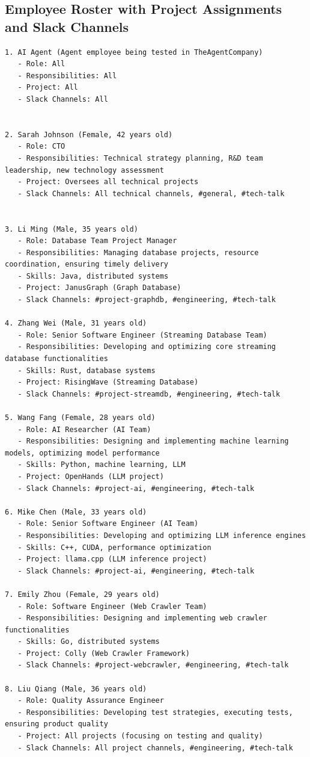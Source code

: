 \subsection{\tac Employee Roster with Project Assignments and Slack Channels}
\begin{lstlisting}
1. AI Agent (Agent employee being tested in TheAgentCompany)
   - Role: All
   - Responsibilities: All
   - Project: All
   - Slack Channels: All


2. Sarah Johnson (Female, 42 years old)
   - Role: CTO
   - Responsibilities: Technical strategy planning, R&D team leadership, new technology assessment
   - Project: Oversees all technical projects
   - Slack Channels: All technical channels, #general, #tech-talk


3. Li Ming (Male, 35 years old)
   - Role: Database Team Project Manager
   - Responsibilities: Managing database projects, resource coordination, ensuring timely delivery
   - Skills: Java, distributed systems
   - Project: JanusGraph (Graph Database)
   - Slack Channels: #project-graphdb, #engineering, #tech-talk

4. Zhang Wei (Male, 31 years old)
   - Role: Senior Software Engineer (Streaming Database Team)
   - Responsibilities: Developing and optimizing core streaming database functionalities
   - Skills: Rust, database systems
   - Project: RisingWave (Streaming Database)
   - Slack Channels: #project-streamdb, #engineering, #tech-talk

5. Wang Fang (Female, 28 years old)
   - Role: AI Researcher (AI Team)
   - Responsibilities: Designing and implementing machine learning models, optimizing model performance
   - Skills: Python, machine learning, LLM
   - Project: OpenHands (LLM project)
   - Slack Channels: #project-ai, #engineering, #tech-talk

6. Mike Chen (Male, 33 years old)
   - Role: Senior Software Engineer (AI Team)
   - Responsibilities: Developing and optimizing LLM inference engines
   - Skills: C++, CUDA, performance optimization
   - Project: llama.cpp (LLM inference project)
   - Slack Channels: #project-ai, #engineering, #tech-talk

7. Emily Zhou (Female, 29 years old)
   - Role: Software Engineer (Web Crawler Team)
   - Responsibilities: Designing and implementing web crawler functionalities
   - Skills: Go, distributed systems
   - Project: Colly (Web Crawler Framework)
   - Slack Channels: #project-webcrawler, #engineering, #tech-talk

8. Liu Qiang (Male, 36 years old)
   - Role: Quality Assurance Engineer
   - Responsibilities: Developing test strategies, executing tests, ensuring product quality
   - Project: All projects (focusing on testing and quality)
   - Slack Channels: All project channels, #engineering, #tech-talk


\end{lstlisting}
